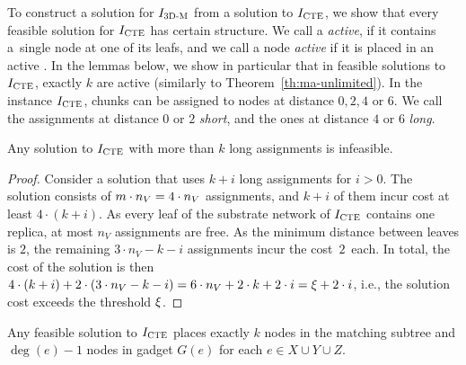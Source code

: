 To construct a solution for $I_{\mathrm{\textsc{3D-M}}}$ from a solution to $I_{\mathrm{\textsc{CTE}}}$, we show that every feasible solution for $I_{\mathrm{\textsc{CTE}}}$ has certain structure.
We call a {\TripleGadget} \textit{active}, if it contains a~single node at one of its leafs, and we call a node \textit{active} if it is placed in an active {\TripleGadget}.
In the lemmas below, we show in particular that in feasible solutions to $I_{\mathrm{\textsc{CTE}}}$, exactly $k$ \TripleGadgets{} are active (similarly to Theorem~\ref{th:ma-unlimited}).
In the instance $I_{\mathrm{\textsc{CTE}}}$, chunks can be assigned to nodes at distance $0, 2, 4$ or $6$.
We call the assignments at distance $0$ or $2$ \emph{short}, and the ones at distance $4$ or $6$ \emph{long}.


  \begin{lemma}
    Any solution to $I_{\mathrm{\textsc{CTE}}}$ with more than $k$ long assignments is infeasible.
    \label{lem:infeasible}
  \end{lemma}
  \begin{proof}
    Consider a solution that uses $k+i$ long assignments for $i>0$.
    The solution consists of $m \cdot n_V = 4\cdot n_V$ assignments, and $k+i$ of them incur cost at least $4\cdot (k+i)$.
    As every leaf of the substrate network of $I_{\mathrm{\textsc{CTE}}}$ contains one replica, at most $n_V$ assignments are free.
    As the minimum distance between leaves is $2$, the remaining $3\cdot n_V - k-i$ assignments incur the cost~$2$~each.
    In total, the cost of the solution is then $4\cdot (k+i) + 2\cdot (3\cdot n_V - k-i) = 6\cdot n_V + 2\cdot k + 2\cdot i = \xi + 2\cdot i$, i.e., the solution cost exceeds the threshold $\xi$.
  \end{proof}

  
\begin{lemma}
  Any feasible solution to $I_{\mathrm{\textsc{CTE}}}$ places exactly $k$ nodes in the matching subtree and $\deg(e) - 1$ nodes in gadget $G(e)$ for each $e \in X \cup Y \cup Z$.
  \label{lem:n-matchsubtree-ma}
\end{lemma}

